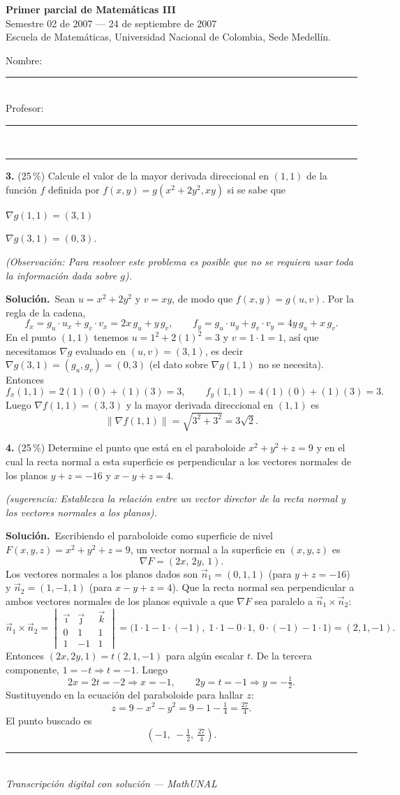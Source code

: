 \documentclass[11pt]{article}
\newcommand{\sol}{\medskip\noindent\textbf{\textcolor{solgreen}{Soluci\'on.}}\ }
\newcommand{\examheader}{%
  \noindent
  \begin{minipage}[t]{0.62\linewidth}
    {\bfseries\large Primer parcial de Matem\'aticas III}\\
    {\small Semestre 02 de 2007 --- 24 de septiembre de 2007}\\
    {\small Escuela de Matem\'aticas, Universidad Nacional de Colombia, Sede Medell\'in.}
  \end{minipage}%
  \hfill
  \begin{minipage}[t]{0.33\linewidth}
    \raggedleft\small
    Nombre: \rule{2.8cm}{0.4pt}\\[4pt]
    Profesor: \rule{2.5cm}{0.4pt}
  \end{minipage}\\[4pt]
  \rule{\linewidth}{0.6pt}
}
\newcommand{\examfooter}{%
  \vfill
  \rule{\linewidth}{0.4pt}\\[1pt]
  {\scriptsize\textit{Transcripci\'on digital con soluci\'on --- MathUNAL}\hfill\textcolor{unalblue}{\textbf{\thepage}}}
}
\begin{document}
\newpage
\examheader
\vspace{2pt}

\noindent\textbf{3.} (25\,\%) Calcule el valor de la mayor derivada direccional en $(1,1)$ de la funci\'on $f$ definida por $f(x,y)=g(x^2+2y^2,xy)$ si se sabe que
\begin{opciones}
  \item[i)] $\nabla g(1,1) = (3,1)$
  \item[ii)] $\nabla g(3,1) = (0,3)$.
\end{opciones}

\textit{(Observaci\'on: Para resolver este problema es posible que no se requiera usar toda la informaci\'on dada sobre $g$).}

\sol Sean $u=x^2+2y^2$ y $v=xy$, de modo que $f(x,y)=g(u,v)$. Por la regla de la cadena,
$$f_x = g_u\cdot u_x + g_v\cdot v_x = 2x\,g_u + y\,g_v, \qquad f_y = g_u\cdot u_y + g_v\cdot v_y = 4y\,g_u + x\,g_v.$$
En el punto $(1,1)$ tenemos $u=1^2+2(1)^2=3$ y $v=1\cdot1=1$, as\'i que necesitamos $\nabla g$ evaluado en $(u,v)=(3,1)$, es decir $\nabla g(3,1)=(g_u,g_v)=(0,3)$ (el dato sobre $\nabla g(1,1)$ no se necesita). Entonces
$$f_x(1,1) = 2(1)(0) + (1)(3) = 3, \qquad f_y(1,1) = 4(1)(0) + (1)(3) = 3.$$
Luego $\nabla f(1,1) = (3,3)$ y la mayor derivada direccional en $(1,1)$ es
$$\|\nabla f(1,1)\| = \sqrt{3^2+3^2} = 3\sqrt{2}.$$

\bigskip
\noindent\textbf{4.} (25\,\%) Determine el punto que est\'a en el paraboloide $x^2+y^2+z=9$ y en el cual la recta normal a esta superficie es perpendicular a los vectores normales de los planos $y+z=-16$ y $x-y+z=4$.

\textit{(sugerencia: Establezca la relaci\'on entre un vector director de la recta normal y los vectores normales a los planos).}

\sol Escribiendo el paraboloide como superficie de nivel $F(x,y,z)=x^2+y^2+z=9$, un vector normal a la superficie en $(x,y,z)$ es
$$\nabla F = (2x,\,2y,\,1).$$
Los vectores normales a los planos dados son $\vec n_1=(0,1,1)$ (para $y+z=-16$) y $\vec n_2=(1,-1,1)$ (para $x-y+z=4$). Que la recta normal sea perpendicular a ambos vectores normales de los planos equivale a que $\nabla F$ sea paralelo a $\vec n_1\times \vec n_2$:
$$\vec n_1\times \vec n_2 = \begin{vmatrix}\vec\imath & \vec\jmath & \vec k\\ 0 & 1 & 1\\ 1 & -1 & 1\end{vmatrix} = \big(1\cdot1-1\cdot(-1),\; 1\cdot1-0\cdot1,\; 0\cdot(-1)-1\cdot1\big) = (2,1,-1).$$
Entonces $(2x,2y,1) = t(2,1,-1)$ para alg\'un escalar $t$. De la tercera componente, $1=-t \Rightarrow t=-1$. Luego
$$2x = 2t = -2 \Rightarrow x=-1, \qquad 2y = t = -1 \Rightarrow y=-\tfrac12.$$
Sustituyendo en la ecuaci\'on del paraboloide para hallar $z$:
$$z = 9-x^2-y^2 = 9-1-\tfrac14 = \tfrac{27}{4}.$$
El punto buscado es
$$\left(-1,\ -\tfrac12,\ \tfrac{27}{4}\right).$$

\vfill
\examfooter
\end{document}
